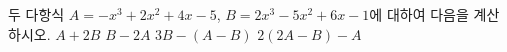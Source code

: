 두 다항식 $A=-x^3+2x^2+4x-5$, $B=2x^3-5x^2+6x-1$에 대하여 다음을 계산하시오.
 $A+2B$
 $B-2A$
 $3B-(A-B)$
 $2(2A-B)-A$
